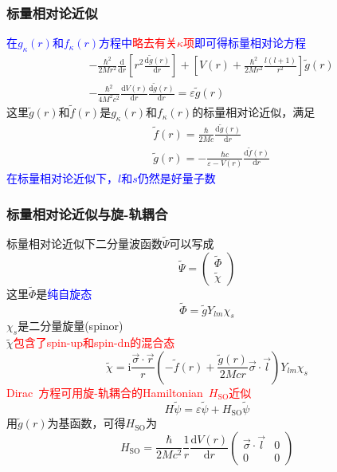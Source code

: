 \frame
{
	\frametitle{标量相对论近似}
	\textcolor{blue}{在$g_{\kappa}(r)$和$f_{\kappa}(r)$方程中}\textcolor{red}{略去有关$\kappa$项}\textcolor{blue}{即可得标量相对论方程}
	\begin{displaymath}
		\begin{aligned}
			&-\frac{\hbar^2}{2Mr^2}\frac{\mathrm{d}}{\mathrm{d}r}\left[ r^2\frac{\mathrm{d}\tilde{g}(r)}{\mathrm{d}r} \right]+\left[ V(r)+\frac{\hbar^2}{2Mr^2}\frac{l(l+1)}{r^2} \right]\tilde{g}(r)\\
			&-\frac{\hbar^2}{4M^2c^2}\frac{\mathrm{d}V(r)}{\mathrm{d}r}\frac{\mathrm{d}\tilde{g}(r)}{\mathrm{d}r}=\varepsilon\tilde{g}(r)
		\end{aligned}
	\end{displaymath}
	这里$\tilde g(r)$和$\tilde f(r)$是$g_{\kappa}(r)$和$f_{\kappa}(r)$的标量相对论近似，满足
	\begin{displaymath}
		\begin{aligned}
			&\tilde{f}(r)=\frac{\hbar}{2Mc}\frac{\mathrm{d}\tilde{g}(r)}{\mathrm{d}r}\\
			&\tilde{g}(r)=-\frac{\hbar c}{\varepsilon-V(r)}\frac{\mathrm{d}\tilde{f}(r)}{\mathrm{d}r}
		\end{aligned}
	\end{displaymath}
	\textcolor{blue}{在标量相对论近似下，$l$和$s$仍然是好量子数}
}

\frame
{
	\frametitle{标量相对论近似与旋-轨耦合}
	标量相对论近似下二分量波函数$\tilde\Psi$可以写成
	\begin{displaymath}
		\tilde\Psi=\left( 
		\begin{matrix}
			\tilde\Phi\\
			\tilde\chi
		\end{matrix}
		\right)
	\end{displaymath}
	这里$\tilde\Phi$是\textcolor{blue}{纯自旋态}$$\tilde\Phi=\tilde gY_{lm}\chi_s$$
	$\chi_s$是二分量旋量(\textrm{spinor})\\
	$\tilde\chi$\textcolor{red}{包含了\textrm{spin-up}和\textrm{spin-dn}的混合态}
	\begin{displaymath}
		\tilde\chi=\mathrm{i}\frac{\vec{\sigma}\cdot\vec r}r\left( -\tilde{f}(r)+\frac{\tilde{g}(r)}{2Mcr}\vec{\sigma}\cdot\vec l \right)Y_{lm}\chi_s
	\end{displaymath}
	\textcolor{red}{\textrm{Dirac~}方程可用旋-轨耦合的\textrm{Hamiltonian~}$H_{\mathrm{SO}}$近似}
	$$H\tilde{\psi}=\varepsilon\tilde{\psi}+H_{\mathrm{SO}}\tilde{\psi}$$
	用$\tilde{g}(r)$为基函数，可得$H_{\mathrm{SO}}$为
	\begin{displaymath}
		H_{\mathrm{SO}}=\frac{\hbar}{2Mc^2}\frac1r\frac{\mathrm{d}V(r)}{\mathrm{d}r}\left( 
		\begin{matrix}
			\vec{\sigma}\cdot\vec l &0\\
			0 &0
		\end{matrix}
		\right)
	\end{displaymath}
}

